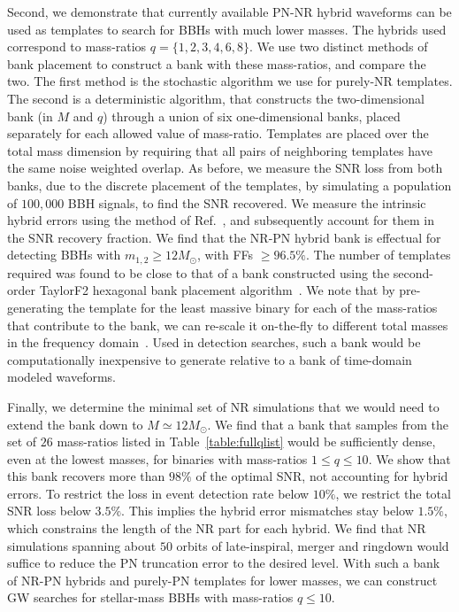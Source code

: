 \documentclass[aps,
prd,
twocolumn,
superscriptaddress,
lengthcheck,showpacs,letterpaper,nofootinbib,
floatfix]{revtex4-1}
\begin{document}
Second, we demonstrate that currently available PN-NR hybrid waveforms can be 
used as templates to search for BBHs with much lower masses. The hybrids
used correspond to mass-ratios $q=\{1,2,3,4,6,8\}$. We use two distinct methods
of bank placement to construct a bank with these mass-ratios, and compare the
two. The first method is the stochastic algorithm we use for purely-NR 
templates. The second is a deterministic algorithm, that constructs the 
two-dimensional bank (in $M$ and $q$) through a union of six one-dimensional
banks, placed separately for each allowed value of mass-ratio. Templates are
placed over the total mass dimension by requiring that all pairs of neighboring
templates have the same noise weighted overlap. As before, we measure the SNR 
loss from both banks, due to the discrete placement of the templates, by 
simulating a population of $100,000$ BBH signals, to find the SNR recovered.
We measure the intrinsic hybrid errors using the method of
Ref.~\cite{MacDonald:2011ne,MacDonald:2012mp}, and subsequently account for 
them in the SNR recovery fraction. We find that the NR-PN
hybrid bank is effectual for detecting BBHs with $m_{1,2}\geq 12M_{\odot}$, 
with FFs $\geq 96.5\%$. The number of templates required was found
to be close to that of a bank constructed using the second-order TaylorF2
hexagonal bank placement algorithm~\cite{Sathyaprakash:1991mt,SathyaMetric2PN,
OwenTemplateSpacing,BabaketalBankPlacement,
SathyaBankPlacementTauN,Cokelaer:2007kx}. We note that by pre-generating the
template for the least massive binary for each of the mass-ratios that 
contribute to the bank, we can re-scale it on-the-fly to different total 
masses in the frequency domain~\cite{Sathyaprakash:2000qx}. 
Used in detection searches, such a bank would be computationally inexpensive 
to generate relative to a bank of time-domain modeled waveforms.

Finally, we determine the minimal set of NR simulations that we would need to 
extend the bank down to $M\simeq 12M_\odot$. We find that a bank that
samples from the set of $26$ mass-ratios listed in Table~\ref{table:fullqlist}
would be sufficiently dense, even at the lowest masses, for binaries with 
mass-ratios $1\leq q\leq 10$. We show that this bank recovers more than
$98\%$ of the optimal SNR, not accounting for hybrid errors. 
To restrict the loss in event detection 
rate below $10\%$, we restrict the total SNR loss below $3.5\%$. 
This implies the hybrid error mismatches stay below $1.5\%$, which 
constrains the length of the NR part for each hybrid.
We find that NR simulations spanning about $50$ orbits of late-inspiral, merger
and ringdown would suffice to reduce the PN truncation error to the desired 
level. With such a bank of NR-PN hybrids and purely-PN templates for lower
masses, we can construct GW searches for stellar-mass BBHs with mass-ratios 
$q\leq 10$.
\end{document}
